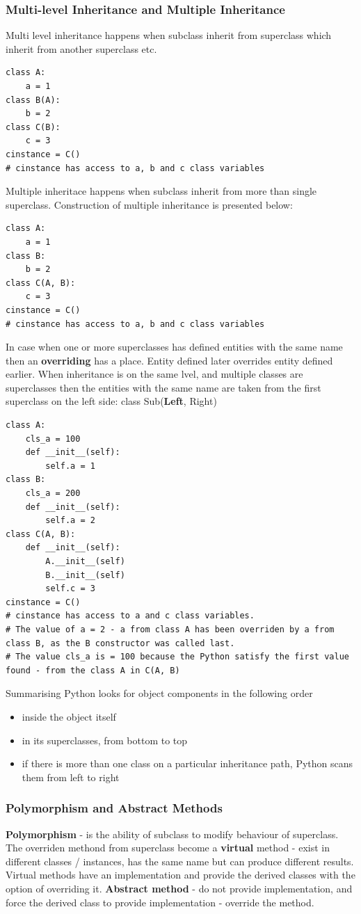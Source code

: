 \documentclass{article}
\begin{document}
\subsubsection{Multi-level Inheritance and Multiple Inheritance}
Multi level inheritance happens when subclass inherit from superclass which inherit from another superclass etc.
\begin{lstlisting}[style=pystyle]
class A:
	a = 1
class B(A):
	b = 2
class C(B):
	c = 3
cinstance = C()
# cinstance has access to a, b and c class variables
\end{lstlisting}
Multiple inheritace happens when subclass inherit from more than single superclass. Construction of multiple inheritance is presented below:
\begin{lstlisting}[style=pystyle]
class A:
	a = 1
class B:
	b = 2
class C(A, B):
	c = 3
cinstance = C()
# cinstance has access to a, b and c class variables
\end{lstlisting}
In case when one or more superclasses has defined entities with the same name then an \textbf{overriding} has a place. Entity defined later overrides entity defined earlier. When inheritance is on the same lvel, and multiple classes are superclasses then the entities with the same name are taken from the first superclass on the left side: class Sub(\textbf{Left}, Right)
\begin{lstlisting}[style=pystyle]
class A:
	cls_a = 100
	def __init__(self):
		self.a = 1
class B:
	cls_a = 200
	def __init__(self):
		self.a = 2
class C(A, B):
    def __init__(self):
        A.__init__(self)
        B.__init__(self)
        self.c = 3
cinstance = C()
# cinstance has access to a and c class variables.
# The value of a = 2 - a from class A has been overriden by a from class B, as the B constructor was called last.
# The value cls_a is = 100 because the Python satisfy the first value found - from the class A in C(A, B)
\end{lstlisting}
Summarising Python looks for object components in the following order
\begin{itemize}
\item inside the object itself
\item in its superclasses, from bottom to top
\item if there is more than one class on a particular inheritance path, Python scans them from left to right
\end{itemize}

\subsubsection{Polymorphism and Abstract Methods}
\textbf{Polymorphism} -  is the ability of subclass to modify behaviour of superclass. The overriden methond from superclass become a \textbf{virtual} method - exist in different classes / instances, has the same name but can produce different results. Virtual methods have an implementation and provide the derived classes with the option of overriding it. \textbf{Abstract method} - do not provide implementation, and force the derived class to provide implementation - override the method.
\end{document}
